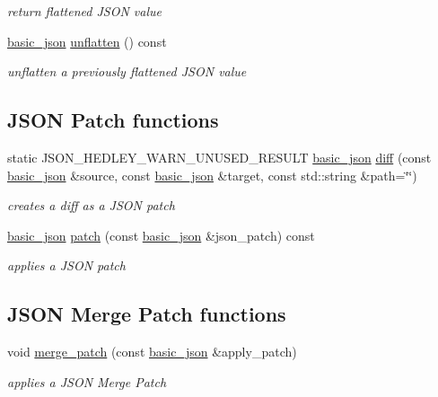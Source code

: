 \begin{DoxyCompactItemize}
\begin{DoxyCompactList}\small\item\em return flattened J\+S\+ON value \end{DoxyCompactList}\item 
\hyperlink{classnlohmann_1_1basic__json}{basic\+\_\+json} \hyperlink{classnlohmann_1_1basic__json_adea158bff8642202420898f6322da479}{unflatten} () const
\begin{DoxyCompactList}\small\item\em unflatten a previously flattened J\+S\+ON value \end{DoxyCompactList}\end{DoxyCompactItemize}
\subsection*{J\+S\+ON Patch functions}
\begin{DoxyCompactItemize}
\item 
static J\+S\+O\+N\+\_\+\+H\+E\+D\+L\+E\+Y\+\_\+\+W\+A\+R\+N\+\_\+\+U\+N\+U\+S\+E\+D\+\_\+\+R\+E\+S\+U\+LT \hyperlink{classnlohmann_1_1basic__json}{basic\+\_\+json} \hyperlink{classnlohmann_1_1basic__json_a1c1f21327df91a4dd6c5f5a107240385}{diff} (const \hyperlink{classnlohmann_1_1basic__json}{basic\+\_\+json} \&source, const \hyperlink{classnlohmann_1_1basic__json}{basic\+\_\+json} \&target, const std\+::string \&path=\char`\"{}\char`\"{})
\begin{DoxyCompactList}\small\item\em creates a diff as a J\+S\+ON patch \end{DoxyCompactList}\item 
\hyperlink{classnlohmann_1_1basic__json}{basic\+\_\+json} \hyperlink{classnlohmann_1_1basic__json_adcc786998f220a5b3083ee8a37c4553e}{patch} (const \hyperlink{classnlohmann_1_1basic__json}{basic\+\_\+json} \&json\+\_\+patch) const
\begin{DoxyCompactList}\small\item\em applies a J\+S\+ON patch \end{DoxyCompactList}\end{DoxyCompactItemize}
\subsection*{J\+S\+ON Merge Patch functions}
\begin{DoxyCompactItemize}
\item 
void \hyperlink{classnlohmann_1_1basic__json_a844a77cb154752d12118f10af26d54cb}{merge\+\_\+patch} (const \hyperlink{classnlohmann_1_1basic__json}{basic\+\_\+json} \&apply\+\_\+patch)
\begin{DoxyCompactList}\small\item\em applies a J\+S\+ON Merge Patch \end{DoxyCompactList}\end{DoxyCompactItemize}


